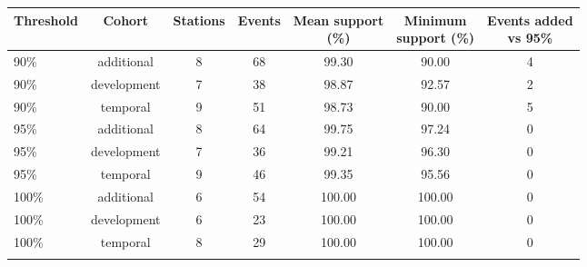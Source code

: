 \documentclass[lineno,pdflatex,sn-apa]{sn-jnl}%
\theoremstyle{thmstyleone}%
\theoremstyle{thmstyletwo}%
\theoremstyle{thmstylethree}%
\begin{document}
\begin{center}
\footnotesize
\setlength{\tabcolsep}{2pt}
\begin{tabular}{@{}lcccccc@{}}
\toprule
Threshold & Cohort & Stations & Events & \shortstack{Mean support\\(\%)} & \shortstack{Minimum\\support (\%)} & \shortstack{Events added\\vs 95\%}\\
\midrule
90\% & additional & 8 & 68 & 99.30 & 90.00 & 4\\
90\% & development & 7 & 38 & 98.87 & 92.57 & 2\\
90\% & temporal & 9 & 51 & 98.73 & 90.00 & 5\\
95\% & additional & 8 & 64 & 99.75 & 97.24 & 0\\
95\% & development & 7 & 36 & 99.21 & 96.30 & 0\\
95\% & temporal & 9 & 46 & 99.35 & 95.56 & 0\\
100\% & additional & 6 & 54 & 100.00 & 100.00 & 0\\
100\% & development & 6 & 23 & 100.00 & 100.00 & 0\\
100\% & temporal & 8 & 29 & 100.00 & 100.00 & 0\\
\botrule
\end{tabular}
\end{center}
\end{document}
